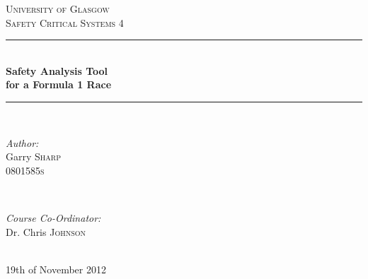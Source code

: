 \documentclass[12pt]{article} %
\begin{document}

\begin{titlepage}

\newcommand{\HRule}{\rule{\linewidth}{0.5mm}} %

\center %

\textsc{\LARGE University of Glasgow}\\[1.5cm] %
\textsc{\Large Safety Critical Systems 4}\\[0.5cm] %

\HRule \\[0.4cm]
{ \huge \bfseries Safety Analysis Tool\\ for a Formula 1 Race }\\[0.4cm] %
\HRule \\[1.5cm]

\begin{minipage}{0.4\textwidth}
\begin{flushleft} \large
\emph{Author:}\\
Garry \textsc{Sharp}\\ %
\textsc{0801585s}
\end{flushleft}
\end{minipage}
~
\begin{minipage}{0.4\textwidth}
\begin{flushright} \large
\emph{Course Co-Ordinator:} \\
Dr. Chris \textsc{Johnson} %
\end{flushright}
\end{minipage}\\[4cm]

{\large 19th of November 2012}\\[3cm] %


\vfill %

\end{titlepage}
\end{document}
